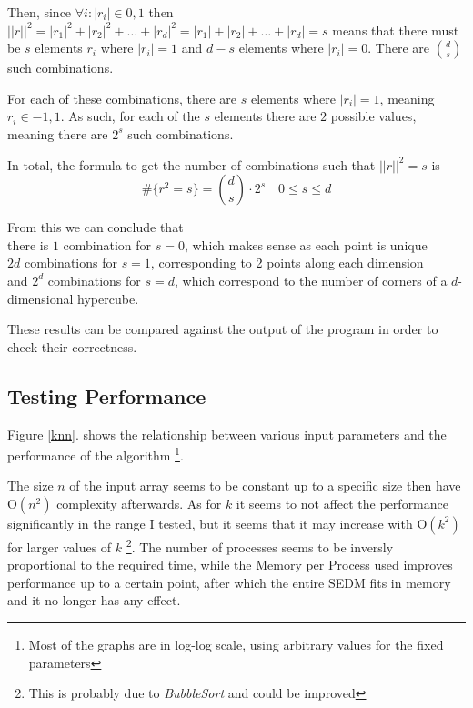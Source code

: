 \documentclass[10pt, a4paper]{article}
\begin{document}
Then, since $\forall i: |r_i| \in {0, 1}$ then $||r||^2 = |r_1|^2 + |r_2|^2 + \ldots + |r_d|^2 = 
|r_1| + |r_2| + \ldots + |r_d| = s$ means that there must be $s$ elements $r_i$ where $|r_i| = 1$ 
and $d - s$ elements where $|r_i| = 0$. There are $d \choose s$ such combinations.

For each of these combinations, there are $s$ elements where $|r_i| = 1$, meaning $r_i \in {-1, 1}$.
As such, for each of the $s$ elements there are $2$ possible values, meaning there are $2^s$ such 
combinations.

In total, the formula to get the number of combinations such that $||r||^2 = s$ is
\begin{equation}
	\#\{ r^2 = s \} = {d \choose s} \cdot 2^s \hspace{12pt} 0 \leq s \leq d
\end{equation}

From this we can conclude that \\
there is $1$ combination for $s = 0$, which makes sense as each point is unique\\
$2d$ combinations for $s = 1$, corresponding to 2 points along each dimension \\
and $2^d$ combinations for $s = d$, which correspond to the number of corners of a $d$-dimensional hypercube.

These results can be compared against the output of the program in order to check their correctness.

\subsection{Testing Performance}

Figure \ref{knn}. shows the relationship between various input parameters and the performance of the algorithm
\footnote{Most of the graphs are in log-log scale, using arbitrary values for the fixed parameters}.

The size $n$ of the input array seems to be constant up to a specific size then have 
$\mathrm{O}(n^2)$ complexity afterwards. 
As for $k$ it seems to not affect the performance significantly in the range I tested, 
but it seems that it may increase with $\mathrm{O}(k^2)$ for larger values of $k$
\footnote {This is probably due to \textit{BubbleSort} and could be improved}.
The number of processes seems to be inversly proportional to the required time, 
while the Memory per Process used improves performance up to a certain point, 
after which the entire SEDM fits in memory and it no longer has any effect.
\end{document}
